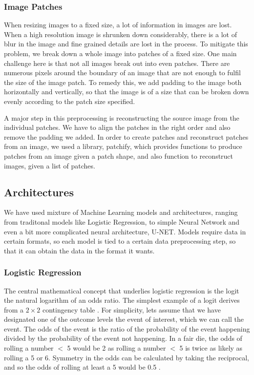 \subsubsection{Image Patches}

When resizing images to a fixed size, a lot of information in images are lost. When a high resolution image is shrunken down considerably, there is a
lot of blur in the image and fine grained details are lost in the process. To mitigate this problem, we break down a whole image into patches of 
a fixed size. One main challenge here is that not all images break out into even patches. There are numerous pixels around the boundary of an image 
that are not enough to fulfil the size of the image patch. To remedy this, we add padding to the image both horizontally and vertically, so that the 
image is of a size that can be broken down evenly according to the patch size specified.

A major step in this preprocessing is reconstructing the source image from the individual patches. We have to align the patches in the right order
and also remove the padding we added. In order to create patches and reconstruct patches from an image, we used a library, patchify, which provides
functions to produce patches from an image given a patch shape, and also function to reconstruct images, given a list of patches. 

\subsection{Architectures}

We have used mixture of Machine Learning models and architectures, ranging from traditonal models like Logistic Regression, to simple Neural Network
and even a bit more complicated neural architecture, U-NET. Models require data in certain formats, so each model is tied to a certain data 
preprocessing step, so that it can obtain the data in the format it wants.

\subsubsection{Logistic Regression}

The central mathematical concept that underlies logistic regression is the logit \textemdash the natural logarithm of an odds ratio.
The simplest example of a logit derives from a $2 \times 2$ contingency table \cite{peng2002introduction}. For simplicity, lets assume that we have 
designated one of the outcome levels the event of interest, which we can call the event. The odds of the event is the ratio of the probability of the 
event happening divided by the probability of the event not happening. In a fair die, the odds of rolling a number $<$ 5
would be 2 as rolling a number $<$ 5 is twice as likely as rolling a 5 or 6. Symmetry in the odds can be calculated by taking the reciprocal, 
and so the odds of rolling at least a 5 would be 0.5 \cite{lavalley2008logistic}.

